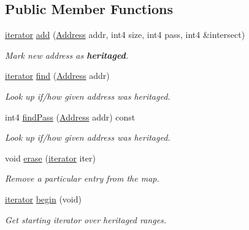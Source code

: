\subsection*{Public Member Functions}
\begin{DoxyCompactItemize}
\item 
\mbox{\hyperlink{class_location_map_a13612b4d0583b85205f3ad6476c2aef9}{iterator}} \mbox{\hyperlink{class_location_map_a72014909f852e240636856c3fec0ca04}{add}} (\mbox{\hyperlink{class_address}{Address}} addr, int4 size, int4 pass, int4 \&intersect)
\begin{DoxyCompactList}\small\item\em Mark new address as {\bfseries{heritaged}}. \end{DoxyCompactList}\item 
\mbox{\hyperlink{class_location_map_a13612b4d0583b85205f3ad6476c2aef9}{iterator}} \mbox{\hyperlink{class_location_map_a46317268798a00ecc792e87a4a360bef}{find}} (\mbox{\hyperlink{class_address}{Address}} addr)
\begin{DoxyCompactList}\small\item\em Look up if/how given address was heritaged. \end{DoxyCompactList}\item 
int4 \mbox{\hyperlink{class_location_map_aa4e4c0f548533f8607a706cf7796c789}{find\+Pass}} (\mbox{\hyperlink{class_address}{Address}} addr) const
\begin{DoxyCompactList}\small\item\em Look up if/how given address was heritaged. \end{DoxyCompactList}\item 
void \mbox{\hyperlink{class_location_map_a50624e32845eeea2cc26a7379c57111d}{erase}} (\mbox{\hyperlink{class_location_map_a13612b4d0583b85205f3ad6476c2aef9}{iterator}} iter)
\begin{DoxyCompactList}\small\item\em Remove a particular entry from the map. \end{DoxyCompactList}\item 
\mbox{\hyperlink{class_location_map_a13612b4d0583b85205f3ad6476c2aef9}{iterator}} \mbox{\hyperlink{class_location_map_ae639047ed4f014b5a05511a65e886398}{begin}} (void)
\begin{DoxyCompactList}\small\item\em Get starting iterator over heritaged ranges. \end{DoxyCompactList}\item 

\end{DoxyCompactItemize}
